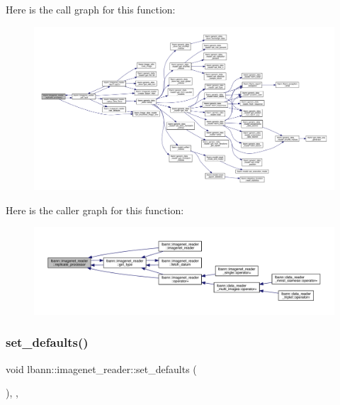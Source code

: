 Here is the call graph for this function\+:\nopagebreak
\begin{figure}[H]
\begin{center}
\leavevmode
\includegraphics[width=350pt]{classlbann_1_1imagenet__reader_a1b642b5eb01b209e72bdd8dfa139cafd_cgraph}
\end{center}
\end{figure}
Here is the caller graph for this function\+:\nopagebreak
\begin{figure}[H]
\begin{center}
\leavevmode
\includegraphics[width=350pt]{classlbann_1_1imagenet__reader_a1b642b5eb01b209e72bdd8dfa139cafd_icgraph}
\end{center}
\end{figure}
\mbox{\label{classlbann_1_1imagenet__reader_ad1e108315d659509a3e166c2f8a4941f}} 
\subsubsection{\texorpdfstring{set\+\_\+defaults()}{set\_defaults()}}
{\footnotesize\ttfamily void lbann\+::imagenet\+\_\+reader\+::set\+\_\+defaults (\begin{DoxyParamCaption}{ }\end{DoxyParamCaption})\hspace{0.3cm}{\ttfamily [override]}, {\ttfamily [protected]}, {\ttfamily [virtual]}}



